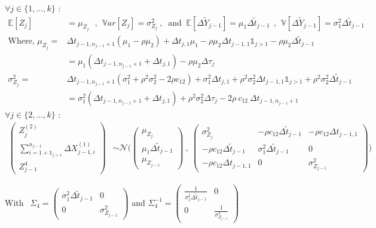 \noindent  $\forall j \in \{1,...,k\}$ : 
\begin{align}
\mathbb{E}[Z_j]&= \mu_{Z_j} \ \ \ , \ \ \mathbb{V}ar[Z_j ] =\sigma^2_{Z_j}\ , \ \text{ and }\ \mathbb{E}[\Delta \tilde Y_{j-1}]= \mu_1 \Delta \tilde t_{j-1}\ \ ,\  \ \mathbb{V}[\Delta \tilde Y_{j-1}]=\sigma_1^2  \Delta \tilde t_{j-1} \\
\text{Where, } \mu_{Z_j} =& \Delta t_{j-1,n_{j-1}+1}( \mu_1-\rho \mu_2) + \Delta t_{j,1} \mu_1-\rho \mu_2  \Delta t_{j-1,1} \mathds{1}_{j>1}  -\rho \mu_2 \Delta \tilde t_{j-1} \nonumber \\
&=\mu_1 (\Delta t_{j-1,n_{j-1}+1} + \Delta t_{j,1}  ) -\rho \mu_2 \Delta \tau_j\\
\sigma^2_{Z_j}=& \Delta t_{j-1,n_{j-1}+1}(\sigma_1^2+ \rho^2 \sigma_2^2-2\rho c_{12})+ \sigma_1^2 \Delta t_{j,1} + \rho^2\sigma_2^2 \Delta t_{j-1,1} \mathds{1}_{j>1} +\rho^2 \sigma_2^2 \Delta \tilde t_{j-1} \nonumber \\
&=\sigma_1^2(\Delta t_{j-1,n_{j-1}+1} + \Delta t_{j,1} )+ \rho^2 \sigma_2^2  \Delta \tau_j - 2 \rho \ c_{12} \ \Delta t_{j-1,n_{j-1}+1}
\end{align}
\noindent  $\forall j \in \{2,...,k\}$ : 
\begin{align}
\begin{pmatrix}
Z_j^{(2)}\\ \sum\limits_{i=1+\mathds{1}_{j>1}}^{n_{j-1}}\Delta X^{(1)}_{j-1,i}\\ Z_{j-1}^4
\end{pmatrix} &\sim \mathcal{N}\Bigg( \begin{pmatrix}
\mu_{Z_j} \\ \mu_1 \Delta \tilde t_{j-1} \\ \mu_{Z_{j-1}}
\end{pmatrix}\ , \ \begin{pmatrix}
\sigma^2_{Z_j} & -\rho c_{12} \Delta \tilde t_{j-1} &  -\rho c_{12} \Delta t_{j-1,1}  \\
 -\rho c_{12} \Delta \tilde t_{j-1} & \sigma_1^2 \Delta \tilde t_{j-1} & 0  \\
   -\rho c_{12} \Delta t_{j-1,1} &   0&\sigma^2_{Z_{j-1}}
\end{pmatrix} \Bigg)
\end{align}

With
$\ \ \Sigma_4= \begin{pmatrix}
\sigma_1^2 \Delta \tilde t_{j-1} & 0  \\
  0&\sigma^2_{Z_{j-1}}
\end{pmatrix}$ \hspace{0.6 cm } and \hspace{0.6 cm } $\Sigma_4^{-1}= \begin{pmatrix}
\frac{1}{\sigma_1^2 \Delta \tilde t_{j-1}} & 0  \\
   0&\frac{1}{\sigma^2_{Z_{j-1}}}
\end{pmatrix}$\\


